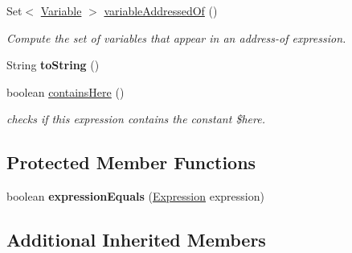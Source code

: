 \begin{DoxyCompactItemize}
Set$<$ \hyperlink{interfaceedu_1_1udel_1_1cis_1_1vsl_1_1civl_1_1model_1_1IF_1_1variable_1_1Variable}{Variable} $>$ \hyperlink{classedu_1_1udel_1_1cis_1_1vsl_1_1civl_1_1model_1_1common_1_1expression_1_1CommonAddressOfExpression_a8f6f73bd272aa60c32e04df873eb453d}{variable\+Addressed\+Of} ()
\begin{DoxyCompactList}\small\item\em Compute the set of variables that appear in an address-\/of expression. \end{DoxyCompactList}\item 
\hypertarget{classedu_1_1udel_1_1cis_1_1vsl_1_1civl_1_1model_1_1common_1_1expression_1_1CommonAddressOfExpression_ab7b8ae4810ceb964f60eec4f5ac2d3c4}{}String {\bfseries to\+String} ()\label{classedu_1_1udel_1_1cis_1_1vsl_1_1civl_1_1model_1_1common_1_1expression_1_1CommonAddressOfExpression_ab7b8ae4810ceb964f60eec4f5ac2d3c4}

\item 
boolean \hyperlink{classedu_1_1udel_1_1cis_1_1vsl_1_1civl_1_1model_1_1common_1_1expression_1_1CommonAddressOfExpression_a85d84eb55bc5c3b0816eb54e61b93012}{contains\+Here} ()
\begin{DoxyCompactList}\small\item\em checks if this expression contains the constant \$here. \end{DoxyCompactList}\end{DoxyCompactItemize}
\subsection*{Protected Member Functions}
\begin{DoxyCompactItemize}
\item 
\hypertarget{classedu_1_1udel_1_1cis_1_1vsl_1_1civl_1_1model_1_1common_1_1expression_1_1CommonAddressOfExpression_a13111e3add20e82ad27e9082e7227e6d}{}boolean {\bfseries expression\+Equals} (\hyperlink{interfaceedu_1_1udel_1_1cis_1_1vsl_1_1civl_1_1model_1_1IF_1_1expression_1_1Expression}{Expression} expression)\label{classedu_1_1udel_1_1cis_1_1vsl_1_1civl_1_1model_1_1common_1_1expression_1_1CommonAddressOfExpression_a13111e3add20e82ad27e9082e7227e6d}

\end{DoxyCompactItemize}
\subsection*{Additional Inherited Members}


